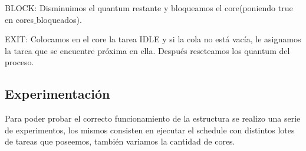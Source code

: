 BLOCK: Disminuimos el quantum restante y bloqueamos el core(poniendo true en cores$\_$bloqueados).

EXIT: Colocamos en el core la tarea IDLE y si la cola no está vacía, le asignamos la tarea que se encuentre próxima en ella. Después reseteamos los quantum del proceso. 


\subsection{Experimentación}
Para poder probar el correcto funcionamiento de la estructura se realizo una serie de experimentos, los mismos consisten en ejecutar el schedule con distintos lotes de tareas que poseemos, también variamos la cantidad de cores. 

